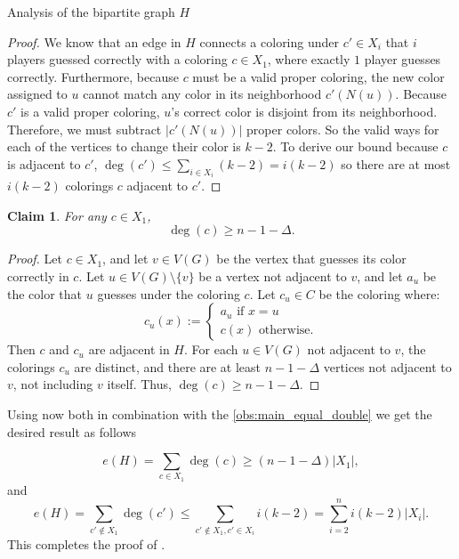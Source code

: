 \documentclass[11pt, letterpaper]{article}
\theoremstyle{plain}
\theoremstyle{plain}
\newtheorem{claim}[theorem]{Claim}
\begin{document}
\begin{section}{Analysis of the bipartite graph $H$}
\begin{proof}
We know that an edge in $H$ connects a coloring under $c' \in X_{i}$ that $i$ players guessed correctly with a coloring $c \in X_{1}$, where exactly $1$ player guesses correctly. Furthermore, because $c$ must be a valid proper coloring, the new color assigned to $u$ cannot match any color in its neighborhood $c'(N(u))$. Because $c'$ is a valid proper coloring, $u$'s correct color is disjoint from its neighborhood. Therefore, we must subtract $\vert{}c'(N(u))\vert{}$ proper colors.
So the valid ways for each of the vertices to change their color is $k-2$. To derive our bound because $c$ is adjacent to $c'$,  $\deg(c') \leq \sum_{i \in X_{i}}(k-2) = i(k-2)$ so there are at most $i(k-2)$ colorings $c$ adjacent to $c'$.
\end{proof}
\begin{claim}\label{clm:2.4clm} 
For any $c\in X_1$, 
    $$\deg (c)\geq n-1-\Delta.$$   
\end{claim}
\begin{proof}
    Let $c \in X_1$, and let $v \in V(G)$ be the vertex that guesses its color correctly in $c$. Let $u \in V(G)\setminus \{v\}$ be a vertex not adjacent to $v$, and let $a_u$ be the color that $u$ guesses under the coloring $c$. 
        Let $c_u \in C$ be the coloring where:
        $$c_u(x):= \begin{cases} a_u \text{ if }x = u \\c(x) \text{ otherwise.}
        \end{cases}$$
        Then $c$ and $c_u$ are adjacent in $H$. For each $u \in V(G)$ not adjacent to $v$, the colorings $c_u$ are distinct, and there are at least $n-1-\Delta$ vertices not adjacent to $v$, not including $v$ itself. Thus, $\deg(c)\geq n-1-\Delta$. %
\end{proof}
\vspace{5em}
Using now both  in combination with the \cref{obs:main_equal_double} we get the desired result as follows 

$$e(H)=\sum_{c\in X_1}  \deg (c)\geq (n-1-\Delta)|X_1|,$$ and $$e(H)=\sum_{c' \notin X_1} \deg(c')\leq \sum _{c' \notin X_1, c' \in X_i} i(k-2)=\sum_{i=2}^{n} i(k-2)|X_i|.$$
This completes the proof of .






\end{section}
\end{document}
